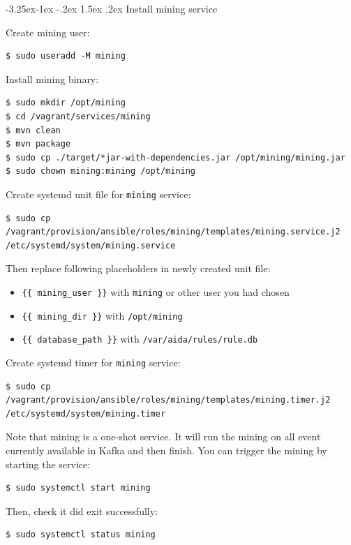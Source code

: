 \documentclass[a4paper]{article} %
\makeatletter
\renewcommand{\normalsize}{\fontsize{12}{15}\selectfont\color{textcolor}}
\renewcommand\subsubsection{\@startsection{subsubsection}{3}{\z@}%
                   {-3.25ex\@plus -1ex \@minus -.2ex}%
                   {1.5ex \@plus .2ex}%
                   {\normalfont\sffamily\normalsize\bfseries\color{projectcolor}}}
\makeatother
\begin{document}
\subsubsection{Install mining service}

Create mining user:
\begin{lstlisting}
$ sudo useradd -M mining
\end{lstlisting}

Install mining binary:
\begin{lstlisting}
$ sudo mkdir /opt/mining
$ cd /vagrant/services/mining
$ mvn clean
$ mvn package
$ sudo cp ./target/*jar-with-dependencies.jar /opt/mining/mining.jar
$ sudo chown mining:mining /opt/mining
\end{lstlisting}

Create systemd unit file for \texttt{mining} service:
\begin{lstlisting}
$ sudo cp /vagrant/provision/ansible/roles/mining/templates/mining.service.j2 /etc/systemd/system/mining.service
\end{lstlisting}

Then replace following placeholders in newly created unit file:
\begin{itemize}[noitemsep,nolistsep]
\item \texttt{\{\{ mining\_user \}\}} with \texttt{mining} or other user you had chosen
\item \texttt{\{\{ mining\_dir \}\}} with \texttt{/opt/mining}
\item \texttt{\{\{ database\_path \}\}} with \texttt{/var/aida/rules/rule.db}
\end{itemize}

Create systemd timer for \texttt{mining} service:
\begin{lstlisting}
$ sudo cp /vagrant/provision/ansible/roles/mining/templates/mining.timer.j2 /etc/systemd/system/mining.timer
\end{lstlisting}

Note that mining is a one-shot service. It will run the mining on all event currently available in Kafka and then finish. You can trigger the mining by starting the service:
\begin{lstlisting}
$ sudo systemctl start mining
\end{lstlisting}

Then, check it did exit successfully:
\begin{lstlisting}
$ sudo systemctl status mining
\end{lstlisting}
\end{document}
